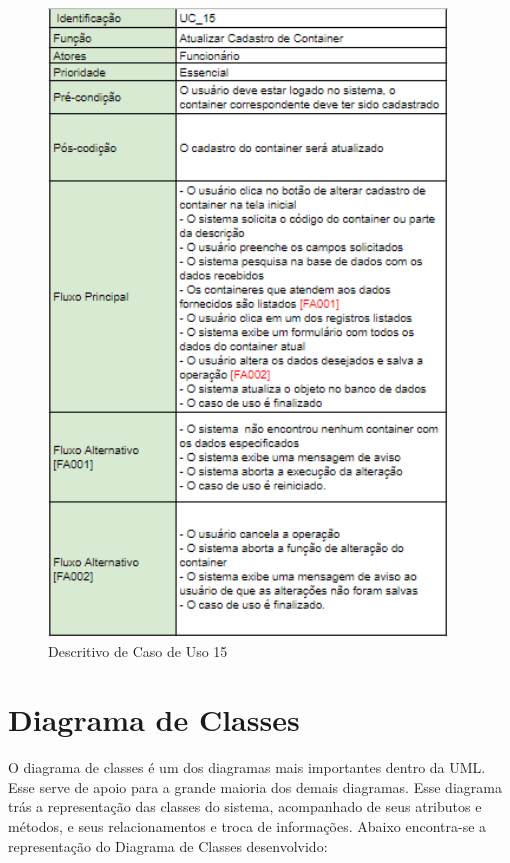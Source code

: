\documentclass[rascunho,xindy,acronym,symbols]{fei}
\begin{document}
\begin{figure}[H]
    \centering
    \includegraphics[scale=0.6, width=300pt]{./Images/Descritivos/UC15.png}
    \caption{Descritivo de Caso de Uso 15}
     \label{fig:desc_uc15}
\end{figure}

\section{Diagrama de Classes} \label{diagramaClasse}

O diagrama de classes é um dos diagramas mais importantes dentro da UML. Esse serve de apoio para a grande maioria dos demais diagramas. Esse diagrama trás a representação das classes do sistema, acompanhado de seus atributos e métodos, e seus relacionamentos e troca de informações. Abaixo encontra-se a representação do Diagrama de Classes desenvolvido:
\end{document}

